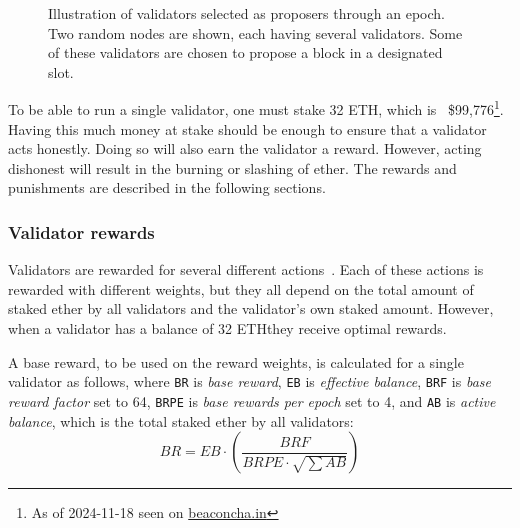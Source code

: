 \begin{figure}[t]
{\label{fig:proposerChoiceTikz}}
\caption{Illustration of validators selected as proposers through an epoch.
Two random nodes are shown, each having several validators.
Some of these validators are chosen to propose a block in a designated slot.}
\label{fig:proposerChoice}
\end{figure}
To be able to run a single validator, one must stake 32 ETH,
which is ~\$99,776\footnote{As of 2024-11-18 seen on \href{https://beaconcha.in/}{beaconcha.in}}.
Having this much money at stake should be enough to ensure that a validator acts honestly.
Doing so will also earn the validator a reward.
However, acting dishonest will result in the burning or slashing of ether.
The rewards and punishments are described in the following sections.
\subsubsection{Validator rewards}\label{subsubsec:valrewards}
Validators are rewarded for several different actions~\cite{PoSRewAndPen}.
Each of these actions is rewarded with different weights,
but they all depend on the total amount of staked ether by all validators and the validator's own staked amount.
However, when a validator has a balance of 32 ETH\@ they receive optimal rewards.

A base reward, to be used on the reward weights, is calculated for a single validator as follows, where \texttt{BR} is \textit{base reward}, \texttt{EB} is \textit{effective balance}, \texttt{BRF} is \textit{base reward factor} set to 64,
\texttt{BRPE} is \textit{base rewards per epoch} set to 4,
and \texttt{AB} is \textit{active balance}, which is the total staked ether by all validators:
\begin{equation}
    BR = EB\cdot(\frac{BRF}{BRPE\cdot \sqrt{\sum{AB}}})
    \label{eq:basereward}
\end{equation}


